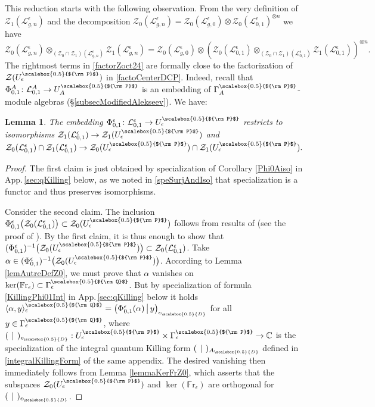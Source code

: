 \documentclass[11pt]{amsart}
\newtheorem{lem}[teo]{Lemma}
\newcommand{\e}{\epsilon}
\newcommand{\Ll}{\mathcal{L}}
\newcommand{\eD}{\epsilon_{\scalebox{0.5}{D}}}
\newcommand{\AD}{A_{\scalebox{0.5}{D}}}
\newcommand{\Q}{{\scalebox{0.5}{${\rm Q}$}}}
\newcommand{\Pup}{{\scalebox{0.5}{${\rm P}$}}}
\begin{document}
This reduction starts with the following observation. From the very definition of $\mathcal{Z}_1(\mathcal{L}_{g,n}^{\e})$ and the decomposition $\mathcal{Z}_0(\mathcal{L}_{g,n}^{\e}) = \mathcal{Z}_0(\mathcal{L}_{g,0}^{\e}) \otimes \mathcal{Z}_0(\mathcal{L}_{0,1}^{\e})^{\otimes n}$ we have 
\begin{equation}\label{factorZoct24}
\mathcal{Z}_0(\mathcal{L}_{g,n}^{\e}) \otimes_{(\mathcal{Z}_0 \cap \mathcal{Z}_1)(\mathcal{L}_{g,n}^{\e})} \mathcal{Z}_1(\mathcal{L}_{g,n}^{\e}) = \mathcal{Z}_0(\mathcal{L}_{g,0}^{\e}) \otimes \left(\mathcal{Z}_0(\Ll_{0,1}^\e) \otimes_{(\mathcal{Z}_0 \cap \mathcal{Z}_1)(\Ll_{0,1}^\e)} \mathcal{Z}_1(\mathcal{L}_{0,1}^{\e})\right)^{\otimes n}.
\end{equation}
The rightmost terms in \eqref{factorZoct24} are formally close to the factorization of $\mathcal{Z}(U_\e^\Pup)$ in \eqref{factoCenterDCP}. Indeed, recall that $\Phi_{0,1}^A\colon \Ll_{0,1}^A\to U_A^\Pup$ is an embedding of $\Gamma_A^\Pup$-module algebras (\S\ref{subsecModifiedAlekseev}). We have:
\begin{lem}\label{Z0Z1Phimai25}
The embedding $\Phi_{0,1}^\e\colon \Ll_{0,1}^\e \to U_\e^\Pup$ restricts to isomorphisms $\mathcal{Z}_1(\Ll_{0,1}^\e) \to \mathcal{Z}_1(U_\e^\Pup)$ and 
$\mathcal{Z}_0(\Ll_{0,1}^\e) \cap \mathcal{Z}_1(\Ll_{0,1}^\e) \to \mathcal{Z}_0(U_\e^\Pup) \cap \mathcal{Z}_1(U_\e^\Pup).$
\end{lem}

\begin{proof} The first claim is just obtained by specialization of Corollary \ref{Phi0Aiso} in App.\,\ref{sec:qKilling} below, as we noted in \eqref{speSurjAndIso} that specialization is a functor and thus preserves isomorphisms.

Consider the second claim. The inclusion $\Phi_{0,1}^{\e}\bigl( \mathcal{Z}_0(\mathcal{L}_{0,1}^\e) \bigr) \subset \mathcal{Z}_0(U_\e^\Pup)$ follows from results of \cite{DC-L} (see the proof of \cite[Prop.\,4.2]{BR2}). By the first claim, it is thus enough to show that $(\Phi_{0,1}^{\e})^{-1}\bigl(\mathcal{Z}_0(U_\e^\Pup)\bigr) \subset \mathcal{Z}_0(\mathcal{L}_{0,1}^\e)$. Take $\alpha \in (\Phi_{0,1}^{\e})^{-1}\bigl(\mathcal{Z}_0(U_\e^\Pup)\bigr)$. According to Lemma \ref{lemAutreDefZ0}, we must prove that $\alpha$ vanishes on $\ker(\mathbb{F}\mathrm{r}_\e) \subset \Gamma^\Q_\e$. But by specialization of formula \eqref{KillingPhi01Int} in App.\,\ref{sec:qKilling} below it holds $\langle \alpha,y \rangle^\Q_{\e} = \bigl( \Phi_{0,1}^\e(\alpha) \,\big|\, y \bigr)_{\eD}$ for all $y \in \Gamma_\e^\Q$, where $(\:\,|\,\:)_{\eD} : U_\e^\Pup \times \Gamma_\e^\Pup \to \mathbb{C}$ is the specialization of the integral quantum Killing form $(\:\,|\,\:)_{\AD}$ defined in \eqref{integralKillingForm} of the same appendix. The desired vanishing then immediately follows from Lemma \ref{lemmaKerFrZ0}, which asserts that the subspaces $\mathcal{Z}_0(U_\e^\Pup)$ and $\ker(\mathbb{F}\mathrm{r}_\e)$ are orthogonal for $(\:\,|\,\:)_{\eD}$.
\end{proof}
\end{document}
